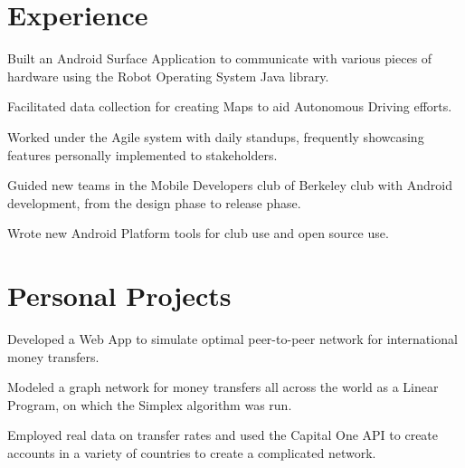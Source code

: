 \documentclass[]{format}
\begin{document}
\begin{minipage}[t]{0.66\textwidth} 


\section{Experience}

\vspace{\topsep} %
\begin{tightemize}
\item Built an Android Surface Application to communicate with various pieces of hardware using the Robot
Operating System Java library.
\item Facilitated data collection for creating Maps to aid Autonomous Driving efforts.
\item Worked under the Agile system with daily standups, frequently showcasing features personally implemented to stakeholders.
\end{tightemize}
\sectionsep

\begin{tightemize}
\item Guided new teams in the Mobile Developers club of Berkeley club with Android development, from the design phase
to release phase.
\item Wrote new Android Platform tools for club use and open source use.
\end{tightemize}
\sectionsep


\section{Personal Projects}
\begin{tightemize}
\item Developed a Web App to simulate optimal peer-to-peer network for international money transfers.
\item Modeled a graph network for money transfers all across the world as a Linear Program, on which the Simplex algorithm was run.
\item Employed real data on transfer rates and used the Capital One API to create accounts in a variety of countries to create a complicated network.
\end{tightemize}
\sectionsep


\end{minipage}
\end{document}
